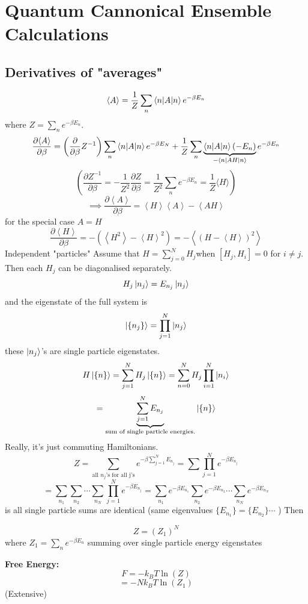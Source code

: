 \documentclass[11pt]{book}
\theoremstyle{definition}
\begin{document}
\section{Quantum Cannonical Ensemble Calculations}
\newcommand{\bzf }{\sum_n e^{-\beta E_n}}
\subsection{Derivatives of "averages"}
\[ \langle A \rangle  =  \frac{1}{Z} \sum_n \braket{n|A|n} e^{-\beta E_n} \] 
where $Z = \sum_n e^{-\beta E_n} $.
\[ \frac{\partial \langle A \rangle}{\partial \beta } 
= \left( \frac{\partial }{\partial \beta} Z^{-1} \right) 
\sum_n \braket{n|A|n} e^{-\beta E_N} + \frac{1}{Z} \sum_n 
\underbrace{\braket{n|A|n} (-E_n)}_{-\braket{n|AH|n}}
e^{-\beta E_n}\]
\[ \left( \frac{\partial Z^{-1}}{\partial \beta} = 
- \frac{1}{Z^2} \frac{\partial Z}{\partial \beta}
= \frac{1}{Z^2} \bzf 
= \frac{1}{Z} \langle H \rangle \right) \] 
\[ \implies \frac{\partial \left \langle A \right \rangle }{\partial \beta} = \left \langle H \right \rangle \left \langle A \right \rangle - \left \langle AH \right \rangle \] 
for the special case $ A= H $ 
\[ \frac{\partial \left \langle H \right \rangle }{\partial \beta} =
-\left( \left \langle H^2 \right \rangle - \left \langle H \right \rangle ^2  \right) 
= - \left \langle \left( H-\left \langle H \right \rangle  \right) ^2 \right \rangle \] 
Independent "particles"
Assume that $ H = \sum_{j=0}^{N} H_j $when $ [H_j, H_i] = 0 $ for $ i \neq j $.
Then each $ H_j $ can be diagonalised separately.
\[ H_j \ket{n_j} = E_{n_j} \ket{n_j} \] 
and the eigenstate of the full system is
\[ \ket{\{n_j\}} = \prod_{j=1}^{N} \ket{n_j}\] these $ \ket{n_j} $'s are single particle eigenstates.
\[ H\ket{\{n\}} = \sum_{j=1}^{N} H_j \ket{\{n\}}
= \sum_{n=0}^{N} H_j \prod_{i=1}^{N} \ket{n_i}\] 
\[ = \underbrace{\sum_{j=1}^{N} E_{n_j}}_{\text{sum of single particle energies.}} 
\ket{\{n\}} \] 
Really, it's just commuting Hamiltonians.
\[ Z = \sum_{\text{all } n_j \text{'s for all j's}} e^{-\beta \sum_{j=1}^{{N}}E_{n_j}} = \sum \prod_{j=1}^{{N}}e^{-\beta E_{n_j}} \] 
\[ = \sum_{n_1} \sum_{n_2} \cdots \sum_{n_N} \prod_{j=1}^{N} e^{-\beta E_{n_j}} 
= 
\sum_{n_1}e^{-\beta E_{n_1}} 
\sum_{n_2}e^{-\beta E_{n_2}}
\cdots
\sum_{n_N}e^{-\beta E_{n_N}}
\] 
is all single particle sums are identical (same eigenvalues $ \{E_{n_1}\}  = \{E_{n_2}\} \cdots $ )
Then
\begin{shaded*}
\[ Z = (Z_1)^{N} \] 
where $ Z_1 = \bzf $ summing over single particle energy eigenstates 
\end{shaded*}
\textbf{Free Energy:} \\
\[ F = -k_B T \ln(Z) \] 
\[ = -Nk_BT\ln(Z_1)  \] (Extensive)
\end{document}
